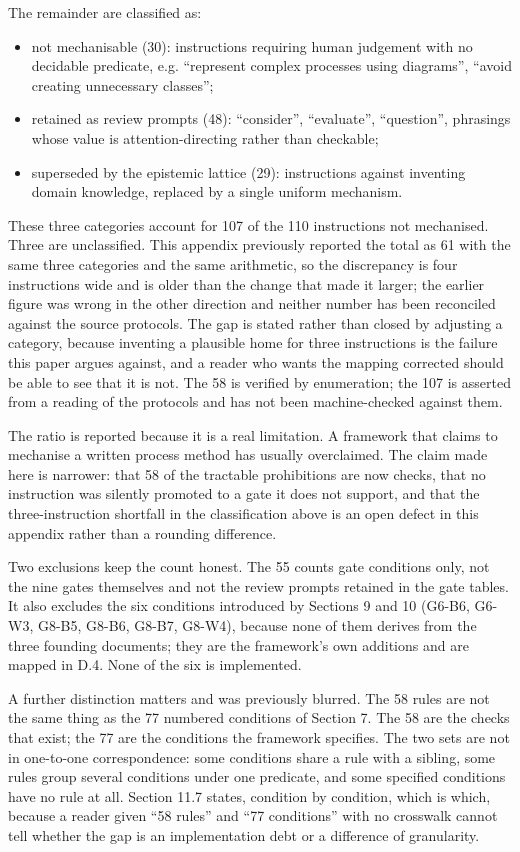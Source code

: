 \documentclass[11pt,a4paper]{article}
\begin{document}
The remainder are classified as:

\begin{itemize}[leftmargin=*,nosep,topsep=2pt]
\item not mechanisable (30): instructions requiring human judgement with no   decidable predicate, e.g. ``represent complex processes using diagrams'',   ``avoid creating unnecessary classes'';
\item retained as review prompts (48): ``consider'', ``evaluate'', ``question'',   phrasings whose value is attention-directing rather than checkable;
\item superseded by the epistemic lattice (29): instructions against inventing   domain knowledge, replaced by a single uniform mechanism.
\end{itemize}

These three categories account for 107 of the 110 instructions not mechanised. Three are unclassified. This appendix previously reported the total as 61 with the same three categories and the same arithmetic, so the discrepancy is four instructions wide and is older than the change that made it larger; the earlier figure was wrong in the other direction and neither number has been reconciled against the source protocols. The gap is stated rather than closed by adjusting a category, because inventing a plausible home for three instructions is the failure this paper argues against, and a reader who wants the mapping corrected should be able to see that it is not. The 58 is verified by enumeration; the 107 is asserted from a reading of the protocols and has not been machine-checked against them.

The ratio is reported because it is a real limitation. A framework that claims to mechanise a written process method has usually overclaimed. The claim made here is narrower: that 58 of the tractable prohibitions are now checks, that no instruction was silently promoted to a gate it does not support, and that the three-instruction shortfall in the classification above is an open defect in this appendix rather than a rounding difference.

Two exclusions keep the count honest. The 55 counts gate conditions only, not the nine gates themselves and not the review prompts retained in the gate tables. It also excludes the six conditions introduced by Sections 9 and 10 (G6-B6, G6-W3, G8-B5, G8-B6, G8-B7, G8-W4), because none of them derives from the three founding documents; they are the framework's own additions and are mapped in D.4. None of the six is implemented.

A further distinction matters and was previously blurred. The 58 rules are not the same thing as the 77 numbered conditions of Section 7. The 58 are the checks that exist; the 77 are the conditions the framework specifies. The two sets are not in one-to-one correspondence: some conditions share a rule with a sibling, some rules group several conditions under one predicate, and some specified conditions have no rule at all. Section 11.7 states, condition by condition, which is which, because a reader given ``58 rules'' and ``77 conditions'' with no crosswalk cannot tell whether the gap is an implementation debt or a difference of granularity.
\end{document}
